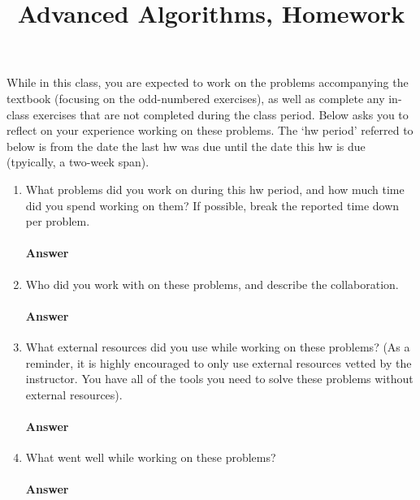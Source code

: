 \documentclass{article}
\title{Advanced Algorithms, Homework \todo{}}
\author{\todo{Put Your Name Here}}
\begin{document}
\maketitle

While in this class, you are expected to work on the problems accompanying the
textbook (focusing on the odd-numbered exercises),
as well as complete any in-class exercises that are not completed
during the class period.
Below asks you to reflect on your experience working on these problems. The
`hw period' referred to below is from the date the last hw was due until the date
this hw is due (tpyically, a two-week span).

\begin{enumerate}
    \item What problems did you work on during this hw period, and how much time
        did you spend working on them?  If possible, break the reported time down per
        problem.

        \paragraph{Answer}

    \item Who did you work with on these problems, and describe the collaboration.

        \paragraph{Answer}

    \item What external resources did you use while working on these problems?
        (As a reminder, it is highly encouraged to only use external resources
        vetted by the instructor. You have all of the tools you need to solve
        these problems without external resources).

        \paragraph{Answer}

    \item What went well while working on these problems?

        \paragraph{Answer}


\end{enumerate}
\end{document}
